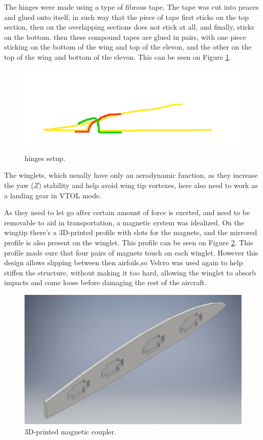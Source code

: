 The hinges were made using a type of fibrous tape. The tape was cut into peaces and glued onto itself, in such way that the piece of tape first sticks on the top section, then on the overlapping sections does not stick at all, and finally, sticks on the bottom.
then these compound tapes are glued in pairs, with one piece sticking on the bottom of the wing and top of the elevon, and the other on the top of the wing and bottom of the elevon. This can be seen on Figure \ref{fig:hinges}.


\begin{figure}[H]
\centering
  \includegraphics[width=\linewidth]{figs/hinges.png}
  \caption{hinges setup.}
  \label{fig:hinges}
\end{figure}
	
	
	
The winglets, which usually have only an aerodynamic function, as they increase the yaw ($Z$) stability and help avoid wing tip vortexes, here also need to work as a landing gear in VTOL mode.

As they need to let go after certain amount of force is exerted, and need to be removable to aid in transportation, a magnetic system was idealized. On the wingtip there's a 3D-printed profile with slots for the magnets, and the mirrored profile is also present on the winglet. This profile can be seen on Figure \ref{fig:magnetcoupler}. This profile made sure that four pairs of magnets touch on each winglet. However this design allows slipping between then airfoils,so Velcro was used again to help stiffen the structure, without making it too hard, allowing the winglet to absorb impacts and come loose before damaging the rest of the aircraft.

	
\begin{figure}[H]
\centering
  \includegraphics[width=\linewidth]{figs/magnetcoupler.png}
  \caption{3D-printed magnetic coupler.}
  \label{fig:magnetcoupler}
\end{figure}
	

